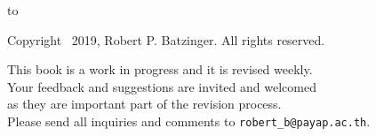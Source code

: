 \medskip
\hbox to 
\vfill
\null
\newpage
\thispagestyle{empty}
\null
\vfill
\begin{center}
\noindent  Copyright \textcopyright\ 2019, Robert P. Batzinger. All rights reserved.\parfillskip=0pt\par
\vskip 0.5in
{\narrower\narrower
\noindent This book is a work in progress and it is revised weekly.\\
Your feedback and suggestions are invited and welcomed\\
as they are important part of the revision process.\\
Please send all inquiries and comments to \verb|robert_b@payap.ac.th|.\par}
\end{center}
\vfill
\vfill
\null
\newpage
\setcounter{page}{-1}

